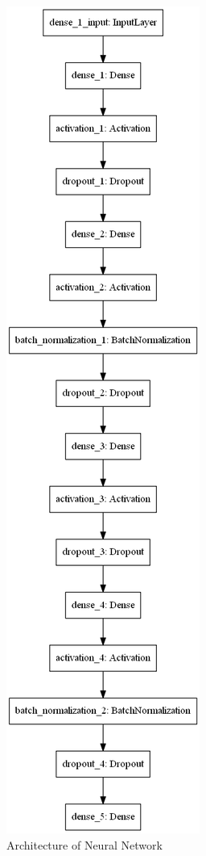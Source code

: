 \begin{figure}[!htbp]
	\centering
	\includegraphics[width=0.55\linewidth]{nn1.png}
	\caption{Architecture of Neural Network}
	\label{fig:nn1}
\end{figure}


